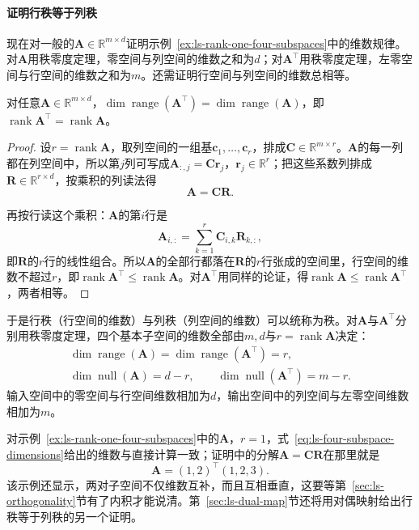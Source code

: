 \paragraph{证明行秩等于列秩}
现在对一般的$\bm A\in\mathbb R^{m\times d}$证明示例~\ref{ex:ls-rank-one-four-subspaces}中的维数规律。对$\bm A$用秩零度定理，零空间与列空间的维数之和为$d$；对$\bm A^\top$用秩零度定理，左零空间与行空间的维数之和为$m$。还需证明行空间与列空间的维数总相等。
\begin{theorem}[行秩等于列秩]
\label{thm:ls-row-rank-column-rank}
对任意$\bm A\in\mathbb R^{m\times d}$，$\dim\operatorname{range}(\bm A^\top)=\dim\operatorname{range}(\bm A)$，即$\operatorname{rank}\bm A^\top=\operatorname{rank}\bm A$。
\end{theorem}
\begin{proof}
设$r=\operatorname{rank}\bm A$，取列空间的一组基$\bm c_1,\ldots,\bm c_r$，排成$\bm C\in\mathbb R^{m\times r}$。$\bm A$的每一列都在列空间中，所以第$j$列可写成$\bm A_{:,j}=\bm C\bm r_j$，$\bm r_j\in\mathbb R^r$；把这些系数列排成$\bm R\in\mathbb R^{r\times d}$，按乘积的列读法得
\[
 \bm A=\bm C\bm R .
\]

再按行读这个乘积：$\bm A$的第$i$行是
\[
 \bm A_{i,:}=\sum_{k=1}^r\bm C_{i,k}\bm R_{k,:},
\]
即$\bm R$的$r$行的线性组合。所以$\bm A$的全部行都落在$\bm R$的$r$行张成的空间里，行空间的维数不超过$r$，即$\operatorname{rank}\bm A^\top\leq\operatorname{rank}\bm A$。对$\bm A^\top$用同样的论证，得$\operatorname{rank}\bm A\leq\operatorname{rank}\bm A^\top$，两者相等。
\end{proof}
于是行秩（行空间的维数）与列秩（列空间的维数）可以统称为秩。对$\bm A$与$\bm A^\top$分别用秩零度定理，四个基本子空间的维数全部由$m,d$与$r=\operatorname{rank}\bm A$决定：
\begin{equation}
 \begin{gathered}
 \dim\operatorname{range}(\bm A)=\dim\operatorname{range}(\bm A^\top)=r,\\
 \dim\operatorname{null}(\bm A)=d-r,\qquad
 \dim\operatorname{null}(\bm A^\top)=m-r.
 \end{gathered}
 \label{eq:ls-four-subspace-dimensions}
\end{equation}
输入空间中的零空间与行空间维数相加为$d$，输出空间中的列空间与左零空间维数相加为$m$。

对示例~\ref{ex:ls-rank-one-four-subspaces}中的$\bm A$，$r=1$，式~\eqref{eq:ls-four-subspace-dimensions}给出的维数与直接计算一致；证明中的分解$\bm A=\bm C\bm R$在那里就是
\[
 \bm A=(1,2)^\top(1,2,3).
\]
该示例还显示，两对子空间不仅维数互补，而且互相垂直，这要等第~\ref{sec:ls-orthogonality}节有了内积才能说清。第~\ref{sec:ls-dual-map}节还将用对偶映射给出行秩等于列秩的另一个证明。

